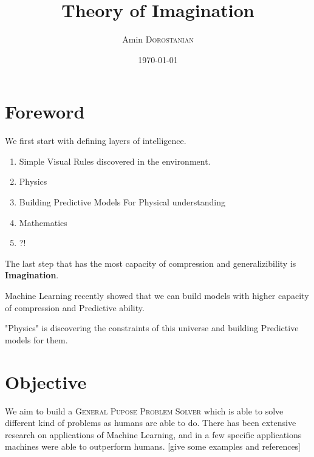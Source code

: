 \documentclass{article}
\title{Theory of Imagination} %
\author{Amin \textsc{Dorostanian}} %
\date{\today} %
\begin{document}
\maketitle %




\section{Foreword}

We first start with defining layers of intelligence.


\begin{enumerate}
    \item Simple Visual Rules discovered in the environment.
    \item Physics
    \item Building Predictive Models For Physical understanding
    \item Mathematics
    \item ?!  
\end{enumerate}

The last step that has the most capacity of compression and generalizibility is \textbf{Imagination}.

Machine Learning recently showed that we can build models with higher capacity of compression and Predictive ability.

"Physics" is discovering the constraints of this universe and building Predictive models for them.


\section{Objective}

We aim to build a \textsc{General Pupose Problem Solver} which is able to solve different kind of problems as humans
are able to do. There has been extensive research on applications of Machine Learning, and in a few specific applications machines were able to outperform humans. [give some examples and references]\\
\end{document}
